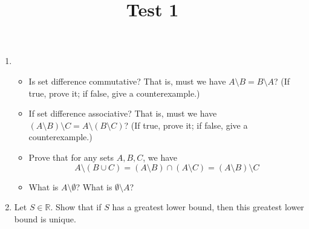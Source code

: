 \documentclass[10pt,a4paper,oneside]{book}
\title{Test 1}
\author{}
\date{}
\begin{document}
\maketitle

\begin{enumerate}
    \item  
    \begin{itemize}
        \item Is set difference commutative? That is, must we have $A\setminus B = B\setminus A$? (If true, prove it; if false, give a counterexample.)
        \item If set difference associative? That is, must we have $(A\setminus B)\setminus C = A\setminus(B\setminus C)$? (If true, prove it; if false, give a counterexample.)
        \item Prove that for any sets $A,B,C$, we have 
        \[A\setminus (B\cup C) = (A\setminus B)\cap (A\setminus C)=(A\setminus B)\setminus C\]
        \item What is $A\setminus \emptyset$? What is $\emptyset \setminus A$?
    \end{itemize}
    \item Let $S\in \mathbb{R}$. Show that if $S$ has a greatest lower bound, then this greatest lower bound is unique.
\end{enumerate}
\end{document}
